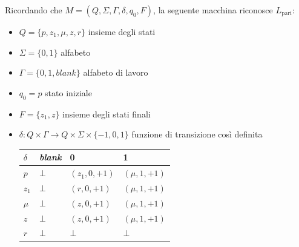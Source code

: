 Ricordando che $M = \left(Q, \Sigma, \Gamma, \delta, q_0, F\right)$, la seguente macchina riconosce $L_{\text{pari}}$:
\begin{itemize}
	\item $Q = \{p, z_1, \mu, z, r\}$ insieme degli stati
	
    \item $\Sigma = \{0,1\}$ alfabeto 
	
    \item $\Gamma = \{0,1, blank\}$ alfabeto di lavoro
	
    \item $q_0 = p$ stato iniziale
	
    \item $F = \{z_1, z\}$ insieme degli stati finali
	
    \item $\delta : Q \times \Gamma \rightarrow Q \times \Sigma \times \{-1, 0, 1\}$ funzione di transizione così definita
	\begin{center}
		\renewcommand{\arraystretch}{1.5}
		\begin{tabular}{| C{40000cm} | C{40000cm} | C{40000cm} | C{40000cm} |}
			\hline
			$\delta$ & \textit{blank} & 0 & 1 \\
			\hline
			$p$ & $\bot$ & $(z_1, 0, +1)$ & $(\mu, 1, +1)$ \\
			\hline
			$z_1$ & $\bot$ & $(r, 0, +1)$ & $(\mu, 1, +1)$ \\
			\hline
			$\mu$ & $\bot$ & $(z, 0, +1)$ & $(\mu, 1, +1)$ \\
			\hline
			$z$ & $\bot$ & $(z, 0, +1)$ & $(\mu, 1, +1)$ \\
			\hline
			$r$ & $\bot$ & $\bot$ & $\bot$ \\
			\hline
		\end{tabular}
	\end{center}
\end{itemize}

